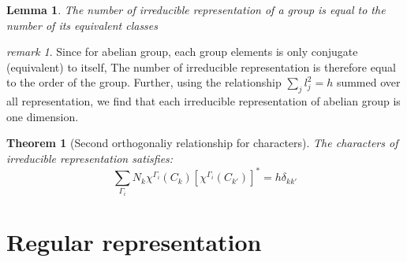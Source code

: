 \documentclass{amsart}
\newtheorem*{theorem}{Theorem}
\newtheorem*{lemma}{Lemma}
\theoremstyle{remark}
\newtheorem*{remark}{remark}
\theoremstyle{remark}
\theoremstyle{definition}
\begin{document}
\begin{lemma}
    The number of irreducible representation of a group is equal to the number of its
    equivalent classes
\end{lemma}
\begin{remark}
Since for abelian group, each group elements is only conjugate (equivalent) to itself, 
The number of irreducible representation is therefore equal to the order of the group. 
Further, using the relationship $\sum_j l_j^2 = h$ summed over all representation, we 
find that each irreducible representation of abelian group is one dimension.
\end{remark}

\begin{theorem}
    [Second orthogonaliy relationship for characters]
    The characters of irreducible representation satisfies:
    \begin{equation*}
        \sum_{\Gamma_i} N_k \chi^{\Gamma_i}(C_k) \left[\chi^{\Gamma_i}(C_{k'})\right]^* = h\delta_{kk'}
    \end{equation*}
\end{theorem}

\vspace{10pt}
\section*{Regular representation}
\end{document}
